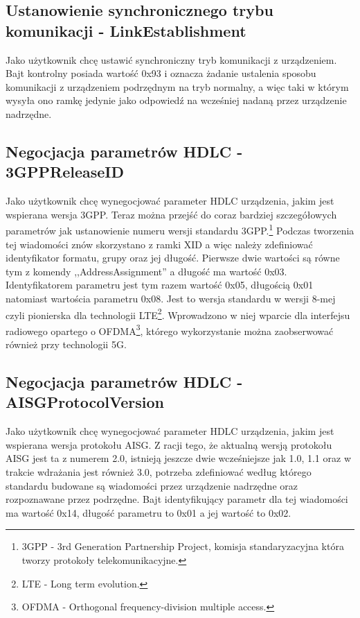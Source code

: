 		\subsection{Ustanowienie synchronicznego trybu komunikacji - LinkEstablishment}
			Jako użytkownik chcę ustawić synchroniczny tryb komunikacji z urządzeniem.
			\newline\newline
			Bajt kontrolny posiada wartość 0x93 i oznacza żadanie ustalenia sposobu komunikacji z urządzeniem podrzędnym na tryb normalny, a więc taki w którym wysyła ono ramkę jedynie jako odpowiedź
			na wcześniej nadaną przez urządzenie nadrzędne.
		 \subsection{Negocjacja parametrów HDLC - 3GPPReleaseID}
			Jako użytkownik chcę wynegocjować parameter HDLC urządzenia, jakim jest wspierana wersja 3GPP. \newline
			\newline\newline
			Teraz można przejść do coraz bardziej szczegółowych parametrów jak ustanowienie numeru wersji standardu 3GPP.\footnote{\label{3GPP} 3GPP - 3rd Generation Partnership Project, komisja standaryzacyjna która tworzy protokoły telekomunikacyjne.}
			Podczas tworzenia tej wiadomości znów skorzystano z ramki XID a więc należy zdefiniować identyfikator formatu, grupy oraz jej długość. Pierwsze dwie wartości są równe tym z komendy ,,AddressAssignment'' a długość ma wartość 0x03.
			Identyfikatorem parametru jest tym razem wartość 0x05, długością 0x01 natomiast wartościa parametru 0x08. Jest to wersja standardu w wersji 8-mej czyli pionierska dla technologii LTE\footnote{\label{LTE} LTE - Long term evolution.}.
			Wprowadzono w niej wparcie dla interfejsu radiowego opartego o OFDMA\footnote{\label{OFDMA} OFDMA - Orthogonal frequency-division multiple access.}, którego wykorzystanie można zaobserwować również przy technologii 5G.
		\subsection{Negocjacja parametrów HDLC - AISGProtocolVersion}
			Jako użytkownik chcę wynegocjować parameter HDLC urządzenia, jakim jest wspierana wersja protokołu AISG. \newline
			Z racji tego, że aktualną wersją protokołu AISG jest ta z numerem 2.0, istnieją jeszcze dwie wcześniejsze jak 1.0, 1.1 oraz w trakcie wdrażania jest również 3.0, potrzeba zdefiniować według którego standardu budowane są
			wiadomości przez urządzenie nadrzędne oraz rozpoznawane przez podrzędne.
			Bajt identyfikujący parametr dla tej wiadomości ma wartość 0x14, długość parametru to 0x01 a jej wartość to 0x02.
